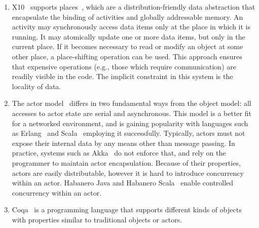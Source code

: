 \documentclass[]{usiinfprospectus}
\begin{document}
\begin{enumerate}
	\item X10~\cite{charles2005x10} supports places~\cite{x10spec}, which are  a distribution-friendly data abstraction that encapsulate the binding of activities and globally addressable memory. An activity may synchronously access data items only at the place in which it is running. It may atomically update one or more data items, but only in the current place. If it becomes necessary to read or modify an object at some other place, a place-shifting operation can be used. This approach ensures that expensive operations (e.g., those which require communication) are readily visible in the code. The implicit constraint in this system is the locality of data.  
	\item The actor model~\cite{agha1985actors} differs in two fundamental ways from the object model: all accesses to actor state are serial and asynchronous. This model is a better fit for a networked environment, and is gaining popularity with languages such as Erlang~\cite{armstrong1993concurrent} and Scala~\cite{odersky2004overview}  employing it successfully. Typically, actors must not expose their internal data by any means other than message passing. In practice, systems such as Akka~\cite{akka} do not enforce that, and rely on the programmer to maintain actor encapsulation. Because of their properties, actors are easily distributable, however it is hard to introduce concurrency within an actor. Habanero Java and Habanero Scala~\cite{imam2012integrating} enable controlled concurrency within an actor. 
	\item Coqa~\cite{liu2008coqa} is a programming language that supports different kinds of objects with properties similar to traditional objects or actors.
\end{enumerate}
\end{document}
